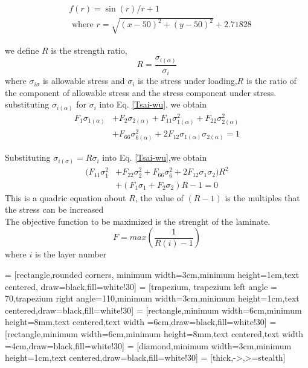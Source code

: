 \documentclass[smallextended]{svjour3}       %
\begin{document}
\begin{equation*}
    \begin{split}
        &f(r)=\sin(r)/r + 1  \\
             &\text{ where  } r=\sqrt{(x-50)^2+(y-50)^2}+2.71828
    \end{split}
\end{equation*}




we define $R$ is the strength ratio,
\begin{equation}\label{strength-ratio}
    R=\frac{\sigma_{i(\alpha)}}{\sigma_i}
\end{equation}
where $\sigma_{i{\sigma}}$ is allowable stress and $\sigma_i$ is the stress under loading,$R$ is
the ratio of the component of allowable stress and the stress component under stress.
substituting $\sigma_{i(\alpha)}$ for $\sigma_i$ into Eq. \ref{Tsai-wu}, we obtain
\begin{equation}
	\begin{split}
		F_1\sigma_{1(\alpha)}&+F_2\sigma_{2(\alpha)}+F_{11}\sigma_{1(\alpha)}^2+F_{22}\sigma_{2(\alpha)}^2 \\
						&+F_{66}\sigma_{6(\alpha)}^2+2F_{12}\sigma_{1(\alpha)}\sigma_{2(\alpha)}=1
    \end{split}
\end{equation}

Substituting $\sigma_{i(\sigma)}=R\sigma_i$  into Eq. \ref{Tsai-wu},we obtain
\begin{equation}
	\begin{split}
		(F_{11}\sigma_1^2&+F_{22}\sigma_2^2+F_{66}\sigma_6^2+2F_{12}\sigma_1\sigma_2)R^2 \\
						 &+(F_1\sigma_1+F_2\sigma_2)R-1=0
	\end{split}
\end{equation}
This is a quadric equation about $R$, the value of $(R-1)$ is the multiples that the stress can be increased              \\
The objective function to be maximized is the strenght of the laminate.
\begin{equation}
	F=max(\frac{1}{R(i)-1})
\end{equation}
where $i$ is the layer number


 = [rectangle,rounded corners, minimum width=3cm,minimum height=1cm,text centered, draw=black,fill=white!30]
 = [trapezium, trapezium left angle = 70,trapezium right angle=110,minimum width=3cm,minimum height=1cm,text centered,draw=black,fill=white!30]
 = [rectangle,minimum width=6cm,minimum height=8mm,text centered,text width =6cm,draw=black,fill=white!30]
 = [rectangle,minimum width=6cm,minimum height=8mm,text centered,text width =4cm,draw=black,fill=white!30]
 = [diamond,minimum width=3cm,minimum height=1cm,text centered,draw=black,fill=white!30]
 = [thick,->,>=stealth]
\end{document}
